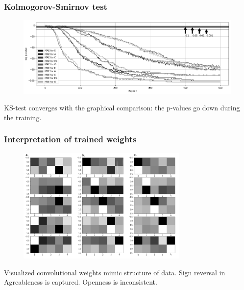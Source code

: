\documentclass[11pt,xcolor=x11names,compress]{beamer}
\renewcommand{\(}{\begin{columns}}
\renewcommand{\)}{\end{columns}}
\newcommand{\<}[1]{\begin{column}{#1}}
\renewcommand{\>}{\end{column}}
\begin{document}
\begin{frame}
	\frametitle{Kolmogorov-Smirnov test}
	\begin{figure}
		\includegraphics[width=\textwidth]{pvalues.png}
	\end{figure}
	\centering
	KS-test converges with the graphical comparison: the p-values go down during the training.
\end{frame}

\begin{frame}
	\frametitle{Interpretation of trained weights}
	\begin{figure}
		\includegraphics[width=0.75\textwidth]{interpretation.png}
	\end{figure}
	\centering
	Visualized convolutional weights mimic structure of data. Sign reversal in Agreableness is captured. Openness is inconsistent.
\end{frame}

\end{document}
